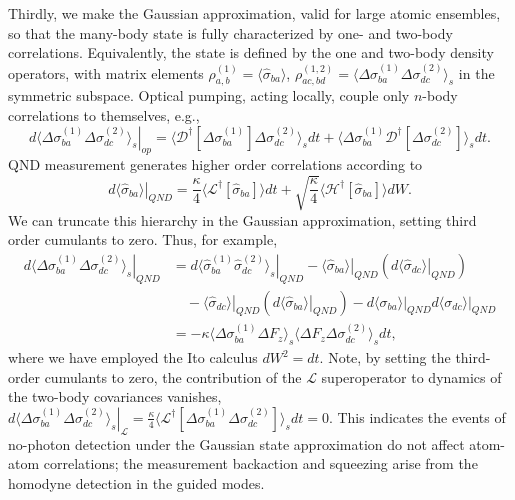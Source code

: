 \documentclass[preprint,aps,pra,onecolumn,superscriptaddress]{revtex4-1} %
\newcommand{\expect}[1]{\big\langle #1 \big\rangle}
\begin{document}
Thirdly, we make the Gaussian approximation, valid for large atomic ensembles, so that the many-body state is fully characterized by one- and two-body correlations. Equivalently, the state is defined by the one and two-body density operators, with matrix elements $\rho^{(1)}_{a, b} =\expect{\hat{\sigma}_{ba}}$, $\rho^{(1,2)}_{ac,bd}=\expect{\Delta \sigma_{ba}^{(1)}\Delta\sigma_{dc}^{(2)} }_s$ in the symmetric subspace.   Optical pumping, acting locally, couple only $n$-body correlations to themselves, e.g.,
\begin{equation}\label{eq:dsigmabadc_op}
\left.d\expect{\Delta \sigma_{ba}^{(1)}\Delta\sigma_{dc}^{(2)} }_s\right|_{op} = \expect{\mathcal{D}^\dagger[\Delta \sigma_{ba}^{(1)}]\Delta\sigma_{dc}^{(2)} }_sdt + \expect{\Delta \sigma_{ba}^{(1)} \mathcal{D}^\dagger[\Delta\sigma_{dc}^{(2)}] }_sdt .
\end{equation}
QND measurement generates higher order correlations according to
\begin{equation}\label{eq:dsigmaba_QND}
\left.d\expect{\hat{\sigma}_{ba}}\right|_{QND} =\frac{\kappa}{4}\expect{\mathcal{L}^\dagger\left[\hat{\sigma}_{ba} \right]}dt + \sqrt{\frac{\kappa}{4}}\expect{\mathcal{H}^\dagger\left[\hat{\sigma}_{ba} \right]}dW .
\end{equation}
We can truncate this hierarchy in the Gaussian approximation, setting third order cumulants to zero.  Thus, for example,
\begin{align}
\left.d\expect{\Delta \sigma_{ba}^{(1)} \Delta \sigma_{dc}^{(2)}}_s \right|_{QND} &= \left.d\expect{\hat{\sigma}_{ba}^{(1)} \hat{\sigma}_{dc}^{(2)}}_s \right|_{QND} - \left. \expect{\hat{\sigma}_{ba}} \right|_{QND} \left( \left.d\expect{\hat{\sigma}_{dc}} \right|_{QND}\right) \nonumber\\
&\quad - \left. \expect{\hat{\sigma}_{dc}} \right|_{QND} \left( \left.d\expect{\hat{\sigma}_{ba}} \right|_{QND}\right)
- \left.d\expect{\sigma_{ba}} \right|_{QND}\left.d\expect{\sigma_{dc}} \right|_{QND} \nonumber \\
&= -\kappa\expect{\Delta \sigma^{(1)}_{ba}  \Delta F_z }_s \expect{\Delta F_z \Delta \sigma_{dc}^{(2)} }_sdt,\label{eq:dsigmabadc_QND}
\end{align}
where we have employed the Ito calculus $dW^2 = dt$.
Note, by setting the third-order cumulants to zero,  the contribution of the $\mathcal{L}$ superoperator to dynamics of the two-body covariances vanishes,  $ \left.d\expect{\Delta \sigma_{ba}^{(1)} \Delta \sigma_{dc}^{(2)}}_s\right|_\mathcal{L} =\frac{\kappa}{4}\expect{\mathcal{L}^\dagger\left[\Delta\sigma_{ba}^{(1)}\Delta\sigma_{dc}^{(2)} \right]}_sdt=0 $.  This indicates the events of no-photon detection under the Gaussian state approximation do not affect atom-atom correlations;  the measurement backaction and squeezing arise from the homodyne detection in the guided modes. 
\end{document}
